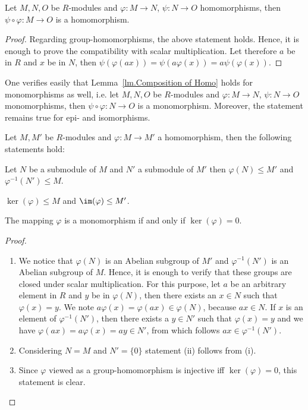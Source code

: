 \begin{lemma}\label{lm.Composition of Homo} Let $M, N, O$ be $R$-modules and $\varphi\colon M\rightarrow N$, $\psi\colon N\rightarrow O$ homomorphisms, then $\psi\circ\varphi\colon M\rightarrow O$ is a homomorphism.
\end{lemma}
\begin{proof}
Regarding group-homomorphisms, the above statement holds. Hence, it is enough to prove the compatibility with scalar multiplication. Let therefore $a$ be in $R$ and $x$ be in $N$, then $\psi(\varphi(ax))=\psi(a\varphi(x))=a\psi(\varphi(x))$.
\end{proof}

One verifies easily that Lemma~\ref{lm.Composition of Homo} holds for monomorphisms as well, i.e. let $M, N, O$ be $R$-modules and $\varphi\colon M\rightarrow N$, $\psi\colon N\rightarrow O$ monomorphisms, then $\psi\circ\varphi\colon N\rightarrow O$ is a monomorphism. Moreover, the statement remains true for epi- and isomorphisms.

\begin{lemma}
Let $M,M'$ be $R$-modules and $\varphi\colon M\rightarrow M'$ a homomorphism, then the following statements hold:
\begin{exlist}
\item Let $N$ be a submodule of $M$ and $N'$ a submodule of $M'$ then $\varphi(N)\leq M'$ and $\varphi^{-1}(N') \leq M$.
\item $\ker(\varphi)\leq M$ and $\im(\varphi)\leq M'$.
\item The mapping $\varphi$ is a monomorphism if and only if $\ker(\varphi)={0}$.
\end{exlist}
\end{lemma}
\begin{proof}
\begin{enumerate}
\item We notice that $\varphi(N)$ is an Abelian subgroup of $M'$ and $\varphi^{-1}(N')$ is an Abelian subgroup of $M$. Hence, it is enough to verify that these groups are closed under scalar multiplication. For this purpose, let $a$ be an arbitrary element in $R$ and $y$ be in $\varphi(N)$, then there exists an $x\in N$ such that $\varphi(x)=y$. We note $a\varphi(x)=\varphi(ax)\in\varphi(N)$, because $ax\in N$. If $x$ is an element of $\varphi^{-1}(N')$, then there exists a $y\in N'$ such that $\varphi(x)=y$ and we have $\varphi(ax)=a\varphi(x)=ay\in N'$, from which follows $ax\in \varphi^{-1}(N')$.
\item Considering $N=M$ and $N'=\lbrace 0\rbrace$ statement (ii) follows from (i).
\item Since $\varphi$ viewed as a group-homomorphism is injective iff $\ker(\varphi)={0}$, this statement is clear.
\end{enumerate}
\end{proof}

